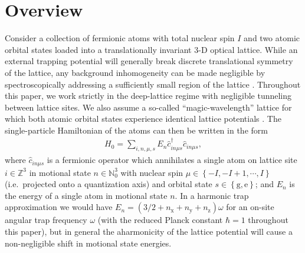 \documentclass[preprint,showkeys,nofootinbib]{revtex4-1}
\newcommand{\p}[1]{\left(#1\right)} %
\renewcommand{\set}[1]{\left\{#1\right\}} %
\newcommand{\g}{\text{g}}
\newcommand{\e}{\text{e}}
\newcommand{\x}{\text{x}}
\newcommand{\y}{\text{y}}
\newcommand{\z}{\text{z}}
\renewcommand{\c}{\hat{c}}
\newcommand{\1}{\mathds{1}}
\begin{document}
\section{Overview}
\label{sec:overview}

Consider a collection of fermionic atoms with total nuclear spin $I$
and two atomic orbital states loaded into a translationally invariant
3-D optical lattice.  While an external trapping potential will
generally break discrete translational symmetry of the lattice, any
background inhomogeneity can be made negligible by spectroscopically
addressing a sufficiently small region of the lattice
\cite{goban2018emergence}.  Throughout this paper, we work strictly in
the deep-lattice regime with negligible tunneling between lattice
sites.  We also assume a so-called ``magic-wavelength'' lattice for
which both atomic orbital states experience identical lattice
potentials \cite{ye2008quantum}.  The single-particle Hamiltonian of
the atoms can then be written in the form
\begin{align}
  H_0 = \sum_{i,n,\mu,s} E_n \c_{in\mu s}^\dag \c_{in\mu s},
  \label{eq:H_0}
\end{align}
where $\c_{in\mu s}$ is a fermionic operator which annihilates a
single atom on lattice site $i\in\mathbb{Z}^3$ in motional state
$n\in\mathbb{N}_0^3$ with nuclear spin $\mu\in\set{-I,-I+1,\cdots,I}$
(i.e.~projected onto a quantization axis) and orbital state
$s\in\set{\g,\e}$; and $E_n$ is the energy of a single atom in
motional state $n$.  In a harmonic trap approximation we would have
$E_n=\p{3/2+n_\x+n_\y+n_\z}\omega$ for an on-site angular trap
frequency $\omega$ (with the reduced Planck constant $\hbar=1$
throughout this paper), but in general the aharmonicity of the lattice
potential will cause a non-negligible shift in motional state
energies.
\end{document}
